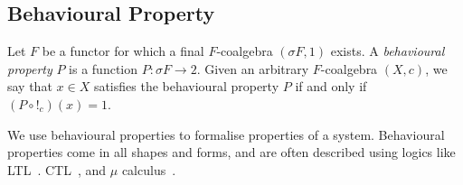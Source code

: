 
\subsection{Behavioural Property}
\label{sec:preliminaries:BehaviouralProperty}
Let $F$ be a functor for which a final $F$-coalgebra $(\sigma F, 1)$ exists. A \emph{behavioural property} $P$ is a function $P\colon \sigma F\rightarrow 2$. Given an arbitrary $F$-coalgebra $(X,c)$, we say that $x\in X$ satisfies the behavioural property $P$ if and only if $(P\circ !_c)(x)=1$.

We use {behavioural properties} to formalise properties of a system. Behavioural properties come in all shapes and forms, and are often described using logics like LTL~\cite{LTL}. CTL~\cite{CTL}, and $\mu$ calculus~\cite{MuCalculus}.



